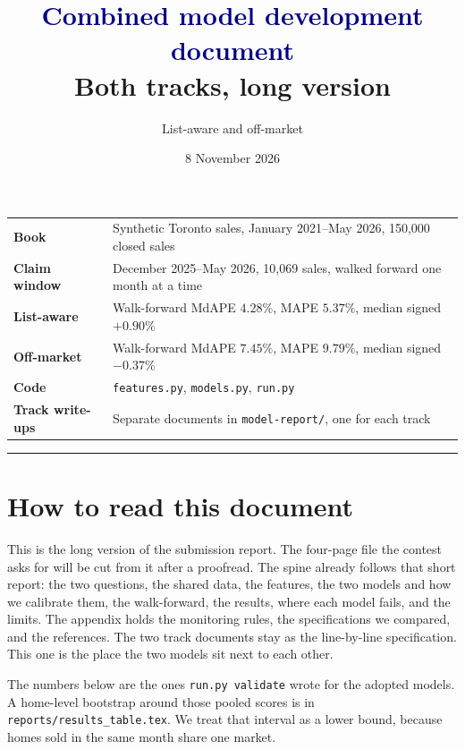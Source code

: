 \documentclass[11pt]{article}
\title{\textcolor{navy}{Combined model development document}\\[4pt]
\large Both tracks, long version}
\author{List-aware and off-market}
\date{8 November 2026}
\begin{document}
\maketitle
\thispagestyle{empty}

\begin{center}
\small
\begin{tabular}{@{}>{\bfseries}l p{11.4cm}@{}}
Book & Synthetic Toronto sales, January 2021--May 2026, 150{,}000 closed sales \\
Claim window & December 2025--May 2026, 10{,}069 sales, walked forward one month at a time \\
List-aware & Walk-forward MdAPE \(4.28\%\), MAPE \(5.37\%\), median signed \(+0.90\%\) \\
Off-market & Walk-forward MdAPE \(7.45\%\), MAPE \(9.79\%\), median signed \(-0.37\%\) \\
Code & \texttt{features.py}, \texttt{models.py}, \texttt{run.py} \\
Track write-ups & Separate documents in \texttt{model-report/}, one for each track \\
\end{tabular}
\end{center}

\vspace{4pt}
{\color{rule}\hrule}
\vspace{8pt}

\section*{How to read this document}

This is the long version of the submission report. The four-page file the contest asks for will be cut from it after a proofread. The spine already follows that short report: the two questions, the shared data, the features, the two models and how we calibrate them, the walk-forward, the results, where each model fails, and the limits. The appendix holds the monitoring rules, the specifications we compared, and the references. The two track documents stay as the line-by-line specification. This one is the place the two models sit next to each other.

The numbers below are the ones \texttt{run.py validate} wrote for the adopted models. A home-level bootstrap around those pooled scores is in \texttt{reports/results\_table.tex}. We treat that interval as a lower bound, because homes sold in the same month share one market.
\end{document}
